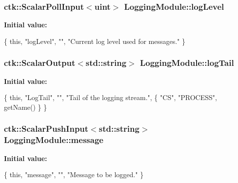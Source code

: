 \subsubsection[{\texorpdfstring{log\+Level}{logLevel}}]{\setlength{\rightskip}{0pt plus 5cm}ctk\+::\+Scalar\+Poll\+Input$<$uint$>$ Logging\+Module\+::log\+Level}\hypertarget{structLoggingModule_a73312a5a93ca0d7ef9e90c02c3dd33b4}{}\label{structLoggingModule_a73312a5a93ca0d7ef9e90c02c3dd33b4}
{\bfseries Initial value\+:}
\begin{DoxyCode}
\{ \textcolor{keyword}{this}, \textcolor{stringliteral}{"logLevel"}, \textcolor{stringliteral}{""},
      \textcolor{stringliteral}{"Current log level used for messages."} \}
\end{DoxyCode}
\subsubsection[{\texorpdfstring{log\+Tail}{logTail}}]{\setlength{\rightskip}{0pt plus 5cm}ctk\+::\+Scalar\+Output$<$std\+::string$>$ Logging\+Module\+::log\+Tail}\hypertarget{structLoggingModule_a454442d06a719179e5719978d5ca26d4}{}\label{structLoggingModule_a454442d06a719179e5719978d5ca26d4}
{\bfseries Initial value\+:}
\begin{DoxyCode}
\{ \textcolor{keyword}{this}, \textcolor{stringliteral}{"LogTail"}, \textcolor{stringliteral}{""}, \textcolor{stringliteral}{"Tail of the logging stream."},
      \{ \textcolor{stringliteral}{"CS"}, \textcolor{stringliteral}{"PROCESS"}, getName() \} \}
\end{DoxyCode}
\subsubsection[{\texorpdfstring{message}{message}}]{\setlength{\rightskip}{0pt plus 5cm}ctk\+::\+Scalar\+Push\+Input$<$std\+::string$>$ Logging\+Module\+::message}\hypertarget{structLoggingModule_a887b82c4a2fbe084b134c5a91da7cf89}{}\label{structLoggingModule_a887b82c4a2fbe084b134c5a91da7cf89}
{\bfseries Initial value\+:}
\begin{DoxyCode}
\{ \textcolor{keyword}{this}, \textcolor{stringliteral}{"message"}, \textcolor{stringliteral}{""},
      \textcolor{stringliteral}{"Message to be logged."} \}
\end{DoxyCode}
